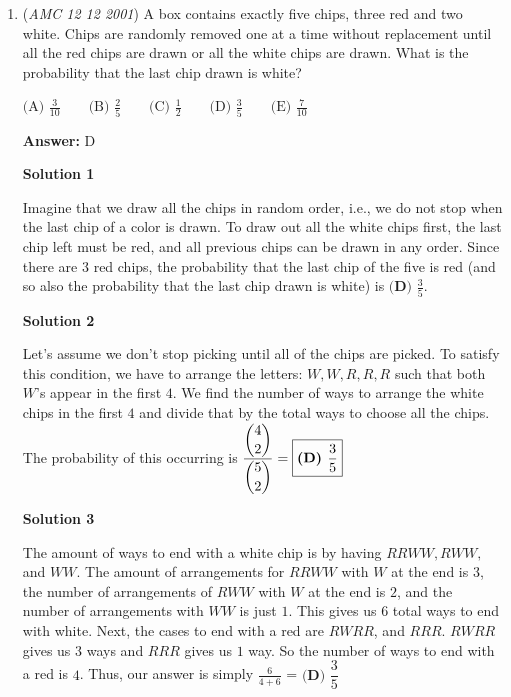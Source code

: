 \begin{enumerate}
 Thus, the side length of the big square is $9$. Because the amount of squares is $36$, the total area of all the small squares is $36$. The area of the big square is $9$*$9$ = $81$. Hence, $\frac{36}{81}$ or $\frac{4}{9}$ of the entire figure is covered by squares. Thus, $\frac{5}{9}$ is covered by pentagons. Expressed as a decimal, this is $55.\overline{5}\%$. The closest percent value to this is $\boxed{\textbf{(D) }56}$.

 


	\item (\textit{AMC 12 12 2001}) A box contains exactly five chips, three red and two white. Chips are randomly removed one at a time without replacement until all the red chips are drawn or all the white chips are drawn. What is the probability that the last chip drawn is white?


 $\text{(A) }\frac {3}{10} \qquad \text{(B) }\frac {2}{5} \qquad \text{(C) }\frac {1}{2} \qquad \text{(D) }\frac {3}{5} \qquad \text{(E) }\frac {7}{10}$

 \textbf{Answer: }D



\textbf{Solution 1}

Imagine that we draw all the chips in random order, i.e., we do not stop when the last chip of a color is drawn. To draw out all the white chips first, the last chip left must be red, and all previous chips can be drawn in any order. Since there are $3$ red chips, the probability that the last chip of the five is red (and so also the probability that the last chip drawn is white) is $\boxed{\textbf{(D) } \frac {3}{5}}$.

 



\textbf{Solution 2}

Let's assume we don't stop picking until all of the chips are picked. To satisfy this condition, we have to arrange the letters: $W, W, R, R, R$ such that both $W$'s appear in the first $4$. We find the number of ways to arrange the white chips in the first $4$ and divide that by the total ways to choose all the chips. The probability of this occurring is $\dfrac{\dbinom{4}{2}}{\dbinom{5}{2}} = \boxed{\textbf{(D) }\dfrac35}$




\textbf{Solution 3}

The amount of ways to end with a white chip is by having $RRWW, RWW,$ and $WW$. The amount of arrangements for $RRWW$ with $W$ at the end is $3$, the number of arrangements of $RWW$ with $W$ at the end is $2$, and the number of arrangements with $WW$ is just $1$. This gives us $6$ total ways to end with white. Next, the cases to end with a red are $RWRR$, and $RRR$. $RWRR$ gives us $3$ ways and $RRR$ gives us $1$ way. So the number of ways to end with a red is $4$. Thus, our answer is simply $\frac{6}{4+6}$ = $\boxed{\textbf{(D) }\dfrac35}$





\end{enumerate}
